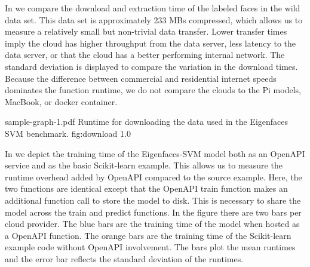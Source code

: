 In  we compare the download and extraction time
of the labeled faces in the wild data set. This data set is
approximately 233 MBs compressed, which allows us to measure a
relatively small but non-trivial data transfer.  Lower transfer times imply the cloud has
higher throughput from the data server, less latency to the data
server, or that the cloud has a better performing internal
network. The standard deviation is displayed to compare the variation
in the download times. Because the difference between commercial and
residential internet speeds dominates the function runtime, we do not
compare the clouds to the Pi models, MacBook, or docker container.

\OneFIGURE
    {sample-graph-1.pdf}
    {Runtime for downloading the data used in the Eigenfaces SVM benchmark.}
    {fig:download}
    {1.0}
    
In  we depict the training time of the
Eigenfaces-SVM model both as an OpenAPI service and as the basic
Scikit-learn example. This allows us to measure the runtime overhead
added by OpenAPI compared to the source example. Here, the two
functions are identical except that the OpenAPI train function makes
an additional function call to store the model to disk. This is
necessary to share the model across the train and predict
functions. In the figure there are two bars per cloud provider. The
blue bars are the training time of the model when hosted as
a \Cloudmesh OpenAPI function. The orange bars are the training time
of the Scikit-learn example code without \Cloudmesh OpenAPI
involvement. The bars plot the mean runtimes and the error bar
reflects the standard deviation of the runtimes.


